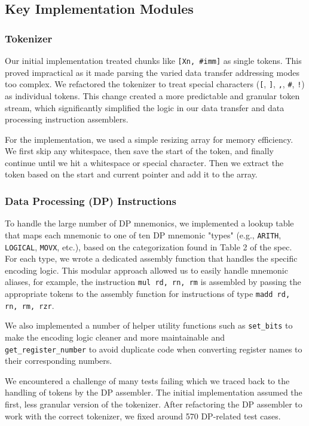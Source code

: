 \documentclass[11pt]{article}
\begin{document}
\subsection{Key Implementation Modules}

\subsubsection{Tokenizer}
Our initial implementation treated chunks like \texttt{[Xn, \#imm]} as single tokens. 
This proved impractical as it made parsing the varied data transfer addressing modes too complex. 
We refactored the tokenizer to treat special characters (\texttt{[}, \texttt{]}, \texttt{,}, \texttt{\#}, \texttt{!}) as individual tokens. 
This change created a more predictable and granular token stream,
which significantly simplified the logic in our data transfer and data processing instruction assemblers.

For the implementation, we used a simple resizing array for memory efficiency.
We first skip any whitespace, then save the start of the token, and finally continue until we hit a whitespace or special character.
Then we extract the token based on the start and current pointer and add it to the array.

\subsubsection{Data Processing (DP) Instructions}
To handle the large number of DP mnemonics, we implemented a lookup table that maps each mnemonic to one of ten DP mnemonic "types" 
(e.g., \texttt{ARITH}, \texttt{LOGICAL}, \texttt{MOVX}, etc.), based on the categorization found in Table 2 of the spec.
For each type, we wrote a dedicated assembly function that handles the specific encoding logic. 
This modular approach allowed us to easily handle mnemonic aliases, for example, the instruction \texttt{mul rd, rn, rm} is 
assembled by passing the appropriate tokens to the assembly function for instructions of type \texttt{madd rd, rn, rm, rzr}.

We also implemented a number of helper utility functions such as \texttt{set\_bits} to make the encoding logic cleaner and more maintainable
and \texttt{get\_register\_number} to avoid duplicate code when converting register names to their corresponding numbers.

We encountered a challenge of many tests failing which we traced back to the handling of tokens by the DP assembler. 
The initial implementation assumed the first, less granular version of the tokenizer.
After refactoring the DP assembler to work with the correct tokenizer, we fixed around 570 DP-related test cases.
\end{document}
